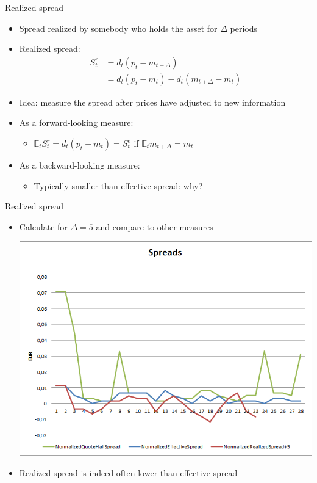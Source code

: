 \documentclass[english,10pt
,aspectratio=169
]{beamer}
\begin{document}
\begin{frame}{Realized spread}
	\begin{itemize}
		\item Spread realized by somebody who holds the asset for $\Delta$ periods
		\item \alert{Realized spread}:
		\begin{align*}
		S^r_t & = d_t(p_t - m_{t+\Delta}) \\
		& = d_t(p_t-m_t) - d_t(m_{t+\Delta}-m_t)
		\end{align*}
		\item Idea: measure the spread after prices have adjusted to new information
		\item As a forward-looking measure:
		\begin{itemize}
			\item $\mathbb{E}_t S_t^r = d_t(p_t - m_t) = S_t^e$ if $\mathbb{E}_t m_{t+\Delta} = m_t$
		\end{itemize}
		\item As a backward-looking measure:
		\begin{itemize}
			\item Typically smaller than effective spread: why?
		\end{itemize}
	\end{itemize}
\end{frame}


\begin{frame}{Realized spread}
	\begin{itemize}
		\item Calculate for $\Delta=5$ and compare to other measures
		\begin{center}
			\includegraphics[scale=0.39]{pics/L2_realizedspread}
		\end{center}
		\item Realized spread is indeed often lower than effective spread
	\end{itemize}
\end{frame}
\end{document}
